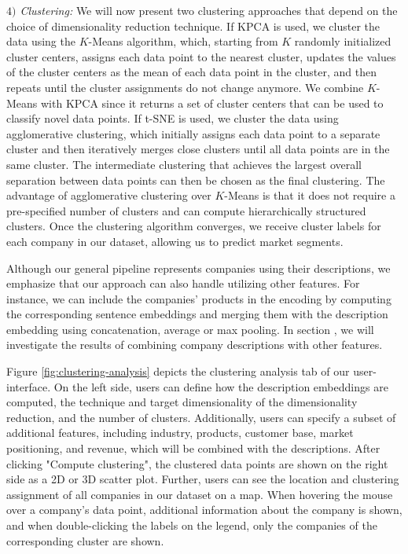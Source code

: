 \documentclass[conference]{IEEEtran}
\begin{document}
\textit{$4)$ Clustering:} We will now present two clustering approaches that depend on the choice of dimensionality reduction technique.
If KPCA is used, we cluster the data using the $K$-Means algorithm, which, starting from $K$ randomly initialized cluster centers, assigns each data point to the nearest cluster, updates the values of the cluster centers as the mean of each data point in the cluster, and then repeats until the cluster assignments do not change anymore. We combine $K$-Means with KPCA since it returns a set of cluster centers that can be used to classify novel data points. 
If t-SNE is used, we cluster the data using agglomerative clustering, which initially assigns each data point to a separate cluster and then iteratively merges close clusters until all data points are in the same cluster. The intermediate clustering that achieves the largest overall separation between data points can then be chosen as the final clustering. The advantage of agglomerative clustering over $K$-Means is that it does not require a pre-specified number of clusters and can compute hierarchically structured clusters.
Once the clustering algorithm converges, we receive cluster labels for each company in our dataset, allowing us to predict market segments.

Although our general pipeline represents companies using their descriptions, we emphasize that our approach can also handle utilizing other features. For instance, we can include the companies' products in the encoding by computing the corresponding sentence embeddings and merging them with the description embedding using concatenation, average or max pooling. In section \MakeUppercase{}, we will investigate the results of combining company descriptions with other features.

Figure \ref{fig:clustering-analysis} depicts the clustering analysis tab of our user-interface. On the left side, users can define how the description embeddings are computed, the technique and target dimensionality of the dimensionality reduction, and the number of clusters. Additionally, users can specify a subset of additional features, including industry, products, customer base, market positioning, and revenue, which will be combined with the descriptions. After clicking "Compute clustering", the clustered data points are shown on the right side as a 2D or 3D scatter plot. Further, users can see the location and clustering assignment of all companies in our dataset on a map. When hovering the mouse over a company's data point, additional information about the company is shown, and when double-clicking the labels on the legend, only the companies of the corresponding cluster are shown.
\end{document}
